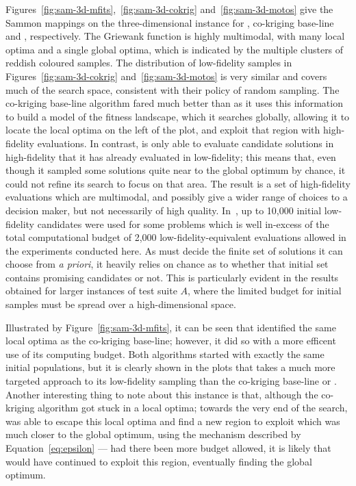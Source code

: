 Figures~\ref{fig:sam-3d-mfits},~\ref{fig:sam-3d-cokrig} and~\ref{fig:sam-3d-motos} give the Sammon mappings on the three-dimensional instance for \AlgName{}, co-kriging base-line and \motos{}, respectively. The Griewank function is highly multimodal, with many local optima and a single global optima, which is indicated by the multiple clusters of reddish coloured samples. The distribution of low-fidelity samples in Figures~\ref{fig:sam-3d-cokrig} and~\ref{fig:sam-3d-motos} is very similar and covers much of the search space, consistent with their policy of random sampling. The co-kriging base-line algorithm fared much better than \motos{} as it uses this information to build a model of the fitness landscape, which it searches globally, allowing it to locate the local optima on the left of the plot, and exploit that region with high-fidelity evaluations. In contrast, \motos{} is only able to evaluate candidate solutions in high-fidelity that it has already evaluated in low-fidelity; this means that, even though it sampled some solutions quite near to the global optimum by chance, it could not refine its search to focus on that area. The result is a set of high-fidelity evaluations which are multimodal, and possibly give a wider range of choices to a decision maker, but not necessarily of high quality. In~\cite{xu2016mo2tos}, up to 10,000 initial low-fidelity candidates were used for some problems which is well in-excess of the total computational budget of 2,000 low-fidelity-equivalent evaluations allowed in the experiments conducted here. As \motos{} must decide the finite set of solutions it can choose from \emph{a priori}, it heavily relies on chance as to whether that initial set contains promising candidates or not. This is particularly evident in the results obtained for larger instances of test suite $A$, where the limited budget for initial samples must be spread over a high-dimensional space.

Illustrated by Figure~\ref{fig:sam-3d-mfits}, it can be seen that \AlgName{} identified the same local optima as the co-kriging base-line; however, it did so with a more efficent use of its computing budget. Both algorithms started with exactly the same initial populations, but it is clearly shown in the plots that \AlgName{} takes a much more targeted approach to its low-fidelity sampling than the co-kriging base-line or \motos{}. Another interesting thing to note about this instance is that, although the co-kriging algorithm got stuck in a local optima; towards the very end of the search, \AlgName{} was able to escape this local optima and find a new region to exploit which was much closer to the global optimum, using the mechanism described by Equation~\ref{eq:epsilon} --- had there been more budget allowed, it is likely that \AlgName{} would have continued to exploit this region, eventually finding the global optimum. 

